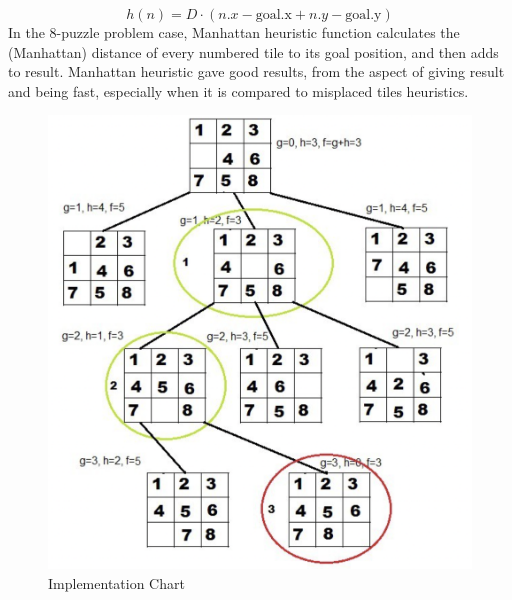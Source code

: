 \documentclass[12pt]{report}
\begin{document}
\[
    h(n) = D \cdot \left(n.x - \text{{goal.x}} + n.y - \text{{goal.y}}\right)
\]
\newline In the 8-puzzle problem case, Manhattan heuristic function
calculates the (Manhattan) distance of every numbered tile
to its goal position, and then adds to result. Manhattan
heuristic gave good results, from the aspect of giving result
and being fast, especially when it is compared to misplaced
tiles heuristics.
\begin{figure}[h]
    \begin{center}
     \includegraphics[scale=0.3]{figures/demostrate.png}
    \end{center}
    \caption{Implementation Chart}
\end{figure}
\end{document}
